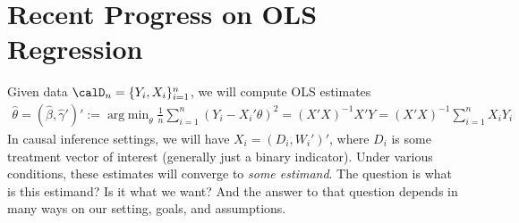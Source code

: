 \documentclass[12pt]{article}
\theoremstyle{plain}
\theoremstyle{definition}
\theoremstyle{remark}
\DeclareMathOperator*{\argmin}{arg\;min}
\newcommand{\sumin}{\sum^n_{i=1}}
\begin{document}
\clearpage
\section{Recent Progress on OLS Regression}

Given data $\calD_n = \{Y_i,X_i\}_{i=1}^n$,
we will compute OLS estimates
\begin{align*}
  \hat{\theta}
  =
  (\hat{\beta},\hat{\gamma}')'
  :=
  \argmin_\theta
  \frac{1}{n}
  \sumin
  (Y_i-X_i'\theta)^2
  =
  (X'X)^{-1}X'Y
  =
  (X'X)^{-1}
  \sumin
  X_iY_i
\end{align*}
In causal inference settings, we will have $X_i=(D_i,W_i')'$, where
$D_i$ is some treatment vector of interest (generally just a binary
indicator).
Under various conditions, these estimates will converge to
\emph{some estimand}.
The question is what is this estimand?
Is it what we want?
And the answer to that question depends in many ways on our setting,
goals, and assumptions.
\end{document}
